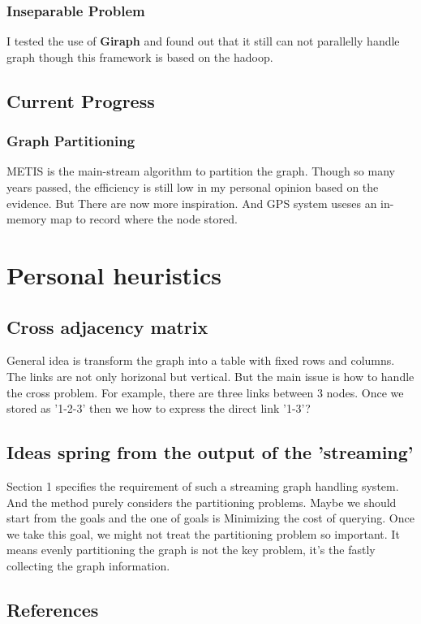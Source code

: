 \documentclass{article}
\begin{document}
	\subsubsection{Inseparable Problem} I tested the use of \textbf{Giraph}\cite{giraph} and found out that it still can not parallelly handle graph though this framework is based on the hadoop\cite{hadoop}.

	\subsection{Current Progress}
	\subsubsection{Graph Partitioning} METIS\cite{metis} is the main-stream algorithm to partition the graph. Though so many years passed, the efficiency is still low in my personal opinion based on the evidence\cite{salihoglu2013gps:}. But There are now more inspiration. And GPS system useses an in-memory map to record where the node stored.

	\newpage
	\section{Personal heuristics}
	\subsection{Cross adjacency matrix}
	General idea is transform the graph into a table with fixed rows and columns. The links are not only horizonal but vertical. But the main issue is how to handle the cross problem. For example, there are three links between 3 nodes. Once we stored as '1-2-3' then we how to express the direct link '1-3'?

	\subsection{Ideas spring from the output of the 'streaming'}
	Section 1 specifies the requirement of such a streaming graph handling system. And the method\cite{stanton2012streaming} purely considers the partitioning problems. Maybe we should start from the goals and the one of goals is Minimizing the cost of querying. Once we take this goal, we might not treat the partitioning problem so important. It means evenly partitioning the graph is not the key problem, it's the fastly collecting the graph information.

	\newpage
	\begin{appendix}
		\section{References}
		
		
	\end{appendix}
\end{document}
